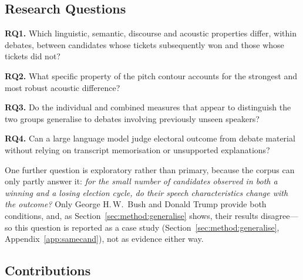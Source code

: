 \documentclass[journal]{IEEEtran}
\begin{document}
\subsection{Research Questions}
\label{sec:intro:rq}

\textbf{RQ1.} Which linguistic, semantic, discourse and acoustic properties
differ, within debates, between candidates whose tickets subsequently won and
those whose tickets did not?

\textbf{RQ2.} What specific property of the pitch contour accounts for the
strongest and most robust acoustic difference?

\textbf{RQ3.} Do the individual and combined measures that appear to
distinguish the two groups generalise to debates involving previously unseen
speakers?

\textbf{RQ4.} Can a large language model judge electoral outcome from debate
material without relying on transcript memorisation or unsupported
explanations?

One further question is exploratory rather than primary, because the corpus
can only partly answer it: \emph{for the small number of candidates observed
in both a winning and a losing election cycle, do their speech
characteristics change with the outcome?} Only George H.\,W.\ Bush and Donald
Trump provide both conditions, and, as Section~\ref{sec:method:generalise}
shows, their results disagree---so this question is reported as a case study
(Section~\ref{sec:method:generalise}, Appendix~\ref{app:samecand}), not as
evidence either way.

\subsection{Contributions}
\label{sec:intro:contrib}
\end{document}
